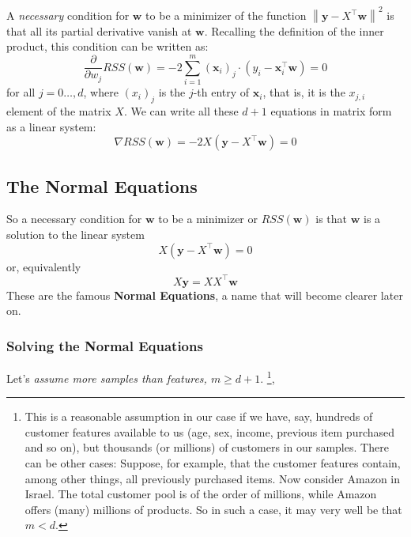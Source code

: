 \documentclass[11pt]{article}
\newcommand{\norm}[1]{\left\| #1\right\|}
\newcommand{\Tr}{\ensuremath{\top}}
\begin{document}
A \textit{necessary} condition for $\mathbf{w}$ to be a minimizer of the function $ \norm{\mathbf{y}-X^\Tr\mathbf{w}}^2$ is that all its partial derivative vanish at $\mathbf{w}$. Recalling the definition of the inner product, this condition can be written as:
    \[
    \frac{\partial}{\partial w_j} RSS(\mathbf{w}) =
    -2\sum_{i=1}^m (\mathbf{x}_i)_j \cdot (y_i-\mathbf{x}_i^\Tr \mathbf{w})=0
    \]
for all $j=0\ldots,d$, where $(x_i)_j$ is the $j$-th entry of  $\mathbf{x}_i$, that is, it is the $x_{j,i}$ element of the matrix $X$.
 We can write all these $d+1$ equations in matrix form as a linear system:
    \[
    \nabla RSS(\mathbf{w}) = -2X(\mathbf{y}-X^\Tr \mathbf{w})=0
    \]


\subsection{The Normal Equations}

So a necessary condition for $\mathbf{w}$ to be a minimizer or $RSS(\mathbf{w})$ is that $\mathbf{w}$ is a solution to the linear system
\[
 X(\mathbf{y}-X^\Tr \mathbf{w})=0
\]
or, equivalently
\[
X \mathbf{y}= XX^\Tr \mathbf{w}
\]
These are the famous \textbf{Normal Equations}, a name that will become clearer later on.


\subsubsection{Solving the Normal Equations}
Let's \textit{assume more samples than features, $m\geq d+1$}. \footnote{This is a reasonable assumption in our case if we have, say, hundreds of customer features available to us (age, sex, income, previous item purchased and so on), but thousands (or millions) of customers in our samples. There can be other cases: Suppose, for example, that the customer features contain, among other things, all previously purchased items. Now consider Amazon in Israel. The total customer pool is of the order of millions, while Amazon offers (many) millions of products. So in such a case, it may very well be that $m<d$.},
\end{document}
